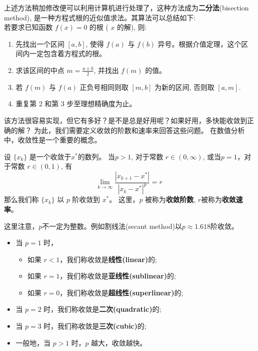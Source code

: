 上述方法稍加修改便可以利用计算机进行处理了，这种方法成为\textbf{二分法}(bisection method),
是一种方程式根的近似值求法。其算法可以总结如下:
\\
若要求已知函数 $f(x)=0$ 的根 ( $x$ 的解), 则:
\begin{enumerate}
    \item  先找出一个区间 $[a, b]$, 使得 $f(a)$ 与 $f(b)$ 异号。根据介值定理，这个区间内一定包含着方程式的根。
    \item  求该区间的中点 $m=\frac{a+b}{2}$, 并找出 $f(m)$ 的值。
    \item  若 $f(m)$ 与 $f(a)$ 正负号相同则取 $[m, b]$ 为新的区间, 否则取 $[a, m]$.
    \item  重复第 2 和第 3 步至理想精确度为止。
\end{enumerate}
该方法很容易实现，但它有多好？是不是总是好用呢？如果好用，多快能收敛到正确的解？
为此，我们需要定义收敛的阶数和速率来回答这些问题。
在数值分析中，收敛性是一个重要的概念。

\begin{definition}
    设 $\{x_k\}$ 是一个收敛于$x^*$的数列。
    当$p>1$, 对于常数 $r\in (0, \infty)$, 
    或当$p=1$，对于常数 $r\in (0, 1)$, 
    有
\begin{equation}
    \lim_{k\to \infty} \frac{|x_{k+1} - x^*| } {|x_k - x^*|^p} = r
\end{equation}
那么我们称 $\{x_k\}$ 以 $p$ 阶收敛到 $x^*$。
这里，$p$ 被称为\textbf{收敛阶数}, $r$被称为\textbf{收敛速率}。
\end{definition}
这里注意，$p$不一定为整数。例如割线法(secant method)以$p\approx 1.618$阶收敛。
\begin{itemize}
    \item 当 $p = 1$ 时，
        \begin{itemize}
            \item 如果 $r < 1$，我们称收敛是\textbf{线性(linear)}的;
            \item 如果 $r = 1$，我们称收敛是\textbf{亚线性(sublinear)}的;
            \item 如果 $r = 0$，我们称收敛是\textbf{超线性(superlinear)}的;
        \end{itemize}
    \item 当 $p = 2$ 时，我们称收敛是\textbf{二次(quadratic)}的;
    \item 当 $p = 3$ 时，我们称收敛是\textbf{三次(cubic)}的;
    \item 一般地，当 $p > 1$ 时，$p$ 越大，收敛越快。
\end{itemize}

